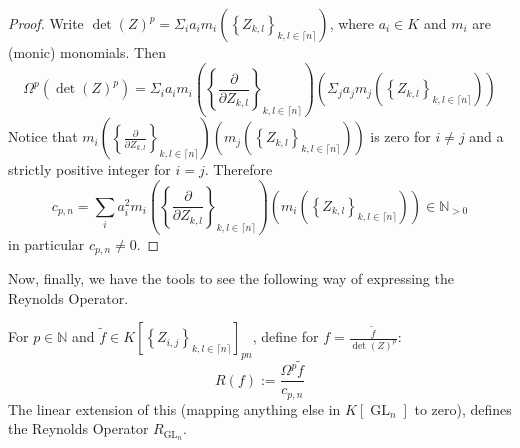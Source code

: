 \begin{proof}
  Write $ \operatorname{det} (Z)^p = \Sigma_i a_i m_i \left( \left\{ Z_{k,l} \right\}_{k,l \in \lceil n \rceil} \right) $, where $a_i \in K$ and $m_i$ are (monic) monomials.
  Then
  \begin{equation}
    \Omega^p \left( \operatorname{det} (Z)^p \right)
    = \Sigma_i a_i m_i \left( \left\{ \frac{\partial}{\partial Z_{k,l}} \right\}_{k,l \in \lceil n \rceil} \right) \left( \Sigma_j a_j m_j \left( \left\{ Z_{k,l} \right\}_{k,l \in \lceil n \rceil} \right) \right)
\end{equation}
Notice that $ m_i \left( \left\{ \frac{\partial}{\partial Z_{k,l}} \right\}_{k,l \in \lceil n \rceil} \right) \left( m_j \left( \left\{ Z_{k,l} \right\}_{k,l \in \lceil n \rceil} \right) \right) $ is zero for $ i \neq j $ and a strictly positive integer for $ i = j $. Therefore
\begin{equation}
  c_{p,n}
  = \sum_i a_i^2 m_i \left( \left\{ \frac{\partial}{\partial Z_{k,l}} \right\}_{k,l \in \lceil n \rceil} \right) \left( m_i \left( \left\{ Z_{k,l} \right\}_{k,l \in \lceil n \rceil} \right) \right) \in \mathbb{N}_{>0}
\end{equation}
in particular $c_{p,n} \neq 0$.
\end{proof}
Now, finally, we have the tools to see the following way of expressing the Reynolds Operator.
\begin{theorem}
  For $ p \in \mathbb{N} $ and $ \tilde{f} \in K \left\lbrack \left\{ Z_{i,j} \right\}_{k,l \in \lceil n \rceil} \right\rbrack_{pn} $, define for $ f = \frac{\tilde{f}}{\operatorname{det}(Z)^p}$:
  \begin{equation}
    R \left( f \right) := \frac{\Omega^p \tilde{f}}{c_{p,n}}
  \end{equation}
  The linear extension of this (mapping anything else in $K \left\lbrack \operatorname{GL}_n \right\rbrack$ to zero), defines the Reynolds Operator $R_{\operatorname{GL}_n}$.
\end{theorem}

